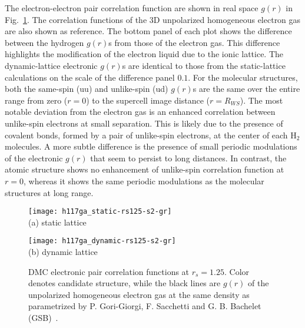 The electron-electron pair correlation function are shown in real space $g(r)$ in Fig.~\ref{fig:hsolid-eegr}.
The correlation functions of the 3D unpolarized homogeneous electron gas are also shown as reference.
The bottom panel of each plot shows the difference between the hydrogen $g(r)$s from those of the electron gas.
This difference highlights the modification of the electron liquid due to the ionic lattice.
The dynamic-lattice electronic $g(r)$s are identical to those from the static-lattice calculations on the scale of the difference panel $0.1$.
For the molecular structures, both the same-spin (uu) and unlike-spin (ud) $g(r)$s are the same over the entire range from zero ($r=0$) to the supercell image distance ($r=R_{WS}$).
The most notable deviation from the electron gas is an enhanced correlation between unlike-spin electrons at small separation.
This is likely due to the presence of covalent bonds, formed by a pair of unlike-spin electrons, at the center of each H$_2$ molecules.
A more subtle difference is the presence of small periodic modulations of the electronic $g(r)$ that seem to persist to long distances.
In contrast, the atomic structure shows no enhancement of unlike-spin correlation function at $r=0$, whereas it shows the same periodic modulations as the molecular structures at long range.

\begin{figure}[h]
\centering
\begin{minipage}{0.49\textwidth}
\centering
\texttt{[image: h117ga\_static-rs125-s2-gr]}\\
(a) static lattice
\end{minipage}
\begin{minipage}{0.49\textwidth}
\centering
\texttt{[image: h117ga\_dynamic-rs125-s2-gr]}\\
(b) dynamic lattice %
\end{minipage}
\caption{DMC electronic pair correlation functions at $r_s=1.25$. Color denotes candidate structure, while the black lines are $g(r)$ of the unpolarized homogeneous electron gas at the same density as parametrized by P. Gori-Giorgi, F. Sacchetti and G. B. Bachelet (GSB)~\cite{Gori-Giorgi2000}.}
\label{fig:hsolid-eegr}
\end{figure}

